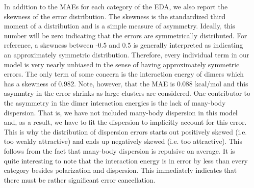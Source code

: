 \documentclass[journal=jacsat,manuscript=article]{achemso}
\begin{document}
In addition to the MAEs for each category of the EDA, we also report the skewness of the error distribution. The skewness is the standardized third moment of a distribution and is a simple measure of asymmetry. Ideally, this number will be zero indicating that the errors are symmetrically distributed. For reference, a skewness between -0.5 and 0.5 is generally interpreted as indicating an approximately symmetric distribution. Therefore, every individual term in our model is very nearly unbiased in the sense of having approximately symmetric errors. The only term of some concern is the interaction energy of dimers which has a skewness of 0.982. Note, however, that the MAE is 0.088 kcal/mol and this asymmtry in the error shrinks as large clusters are considered. One contributor to the asymmetry in the dimer interaction energies is the lack of many-body dispersion. That is, we have not included many-body dispersion in this model and, as a result, we have to fit the dispersion to implicitly account for this error. This is why the distribution of dispersion errors starts out positively skewed (i.e. too weakly attractive) and ends up negatively skewed (i.e. too attractive). This follows from the fact that many-body dispersion is repulsive on average. It is quite interesting to note that the interaction energy is in error by less than every category besides polarization and dispersion. This immediately indicates that there must be rather significant error cancellation.
\end{document}
